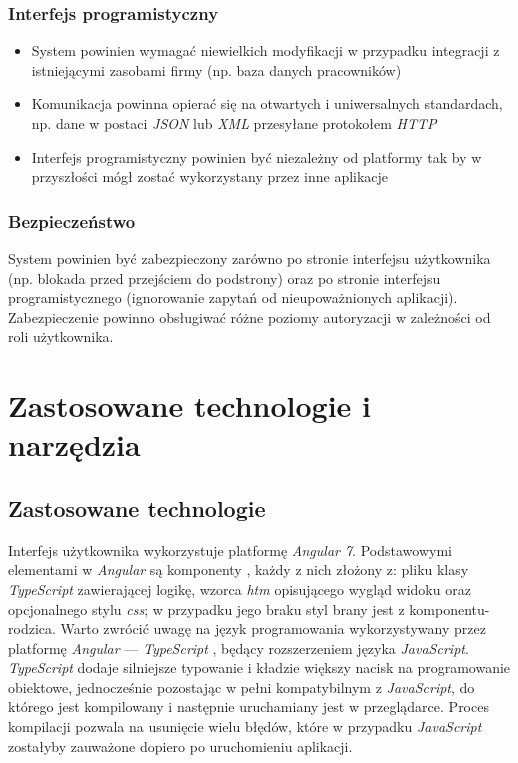 \documentclass[eng,printmode,openany]{mgr}
\begin{document}
	\subsection{Interfejs programistyczny}
	\begin{itemize}
		\item System powinien wymagać niewielkich modyfikacji w przypadku integracji z istniejącymi zasobami firmy (np. baza danych pracowników)
		\item Komunikacja powinna opierać się na otwartych i uniwersalnych standardach, np. dane w postaci \textit{JSON} lub \textit{XML} przesyłane protokołem \textit{HTTP}
		\item Interfejs programistyczny powinien być niezależny od platformy tak by w przyszłości mógł zostać wykorzystany przez inne aplikacje
	\end{itemize}
	\subsection{Bezpieczeństwo}
	System powinien być zabezpieczony zarówno po stronie interfejsu użytkownika (np. blokada przed przejściem do podstrony) oraz po stronie interfejsu programistycznego (ignorowanie zapytań od nieupoważnionych aplikacji). Zabezpieczenie powinno obsługiwać różne poziomy autoryzacji w zależności od roli użytkownika.
	
	\newpage
	\chapter{Zastosowane technologie i narzędzia}
	\section{Zastosowane technologie}
	Interfejs użytkownika wykorzystuje platformę \textit{Angular 7}. Podstawowymi elementami w \textit{Angular} są komponenty \cite{angular-components}, każdy z nich złożony z: pliku klasy \textit{TypeScript} zawierającej logikę, wzorca \textit{htm} opisującego wygląd widoku oraz opcjonalnego stylu \textit{css}; w przypadku jego braku styl brany jest z komponentu-rodzica. Warto zwrócić uwagę na język programowania wykorzystywany przez platformę \textit{Angular} — \textit{TypeScript} \cite{msdn-ts}, będący rozszerzeniem języka \textit{JavaScript}. \textit{TypeScript} dodaje silniejsze typowanie i kładzie większy nacisk na programowanie obiektowe, jednocześnie pozostając w pełni kompatybilnym z \textit{JavaScript}, do którego jest kompilowany i  następnie uruchamiany jest w przeglądarce. Proces kompilacji pozwala na usunięcie wielu błędów, które w przypadku \textit{JavaScript} zostałyby zauważone dopiero po uruchomieniu aplikacji.
	
\end{document}
